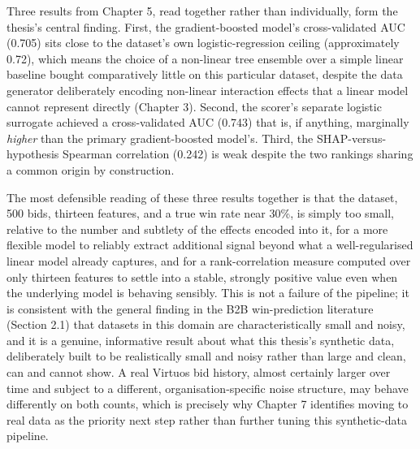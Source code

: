 \documentclass[12pt,oneside]{report}
\begin{document}
Three results from Chapter 5, read together rather than individually,
form the thesis's central finding. First, the gradient-boosted model's
cross-validated AUC (0.705) sits close to the dataset's own
logistic-regression ceiling (approximately 0.72), which means the choice
of a non-linear tree ensemble over a simple linear baseline bought
comparatively little on this particular dataset, despite the data
generator deliberately encoding non-linear interaction effects that a
linear model cannot represent directly (Chapter 3). Second, the scorer's
separate logistic surrogate achieved a cross-validated AUC (0.743) that
is, if anything, marginally \emph{higher} than the primary
gradient-boosted model's. Third, the SHAP-versus-hypothesis Spearman
correlation (0.242) is weak despite the two rankings sharing a common
origin by construction.

The most defensible reading of these three results together is that the
dataset, 500 bids, thirteen features, and a true win rate near 30\%, is
simply too small, relative to the number and subtlety of the effects
encoded into it, for a more flexible model to reliably extract
additional signal beyond what a well-regularised linear model already
captures, and for a rank-correlation measure computed over only thirteen
features to settle into a stable, strongly positive value even when the
underlying model is behaving sensibly. This is not a failure of the
pipeline; it is consistent with the general finding in the B2B
win-prediction literature (Section 2.1) that datasets in this domain are
characteristically small and noisy, and it is a genuine, informative
result about what this thesis's synthetic data, deliberately built to be
realistically small and noisy rather than large and clean, can and
cannot show. A real Virtuos bid history, almost certainly larger over
time and subject to a different, organisation-specific noise structure,
may behave differently on both counts, which is precisely why Chapter 7
identifies moving to real data as the priority next step rather than
further tuning this synthetic-data pipeline.
\end{document}

